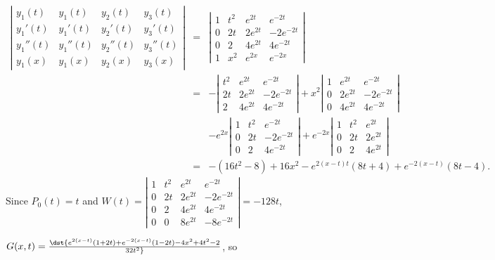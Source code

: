 \documentclass[dvips]{book}
\renewcommand{\exer}[1]{\par\medskip\;\noindent{\color{red}\bf #1.}}
\numberwithin{example}{section}
\numberwithin{equation}{section}
\numberwithin{theorem}{section}
\numberwithin{table}{section}
\numberwithin{figure}{section}
\begin{document}
\exer{9.4.42}
\begin{eqnarray*}
\left|\begin{array}{crcc}
y_1(t)&y_1(t)&y_2(t)&y_3(t)\\
y_1'(t)&y_1'(t)&y_2'(t)&y_3'(t)\\
y_1''(t)&y_1''(t)&y_2''(t)&y_3''(t)\\
y_1(x)&y_1(x)&y_2(x)&y_3(x)
\end{array}\right|&=&
\left|\begin{array}{cccc}
1&t^2&e^{2t}&e^{-2t}\\
0&2t&2e^{2t}&-2e^{-2t}\\
0&2&4e^{2t}&4e^{-2t}\\
1&x^2&e^{2x}&e^{-2x}
\end{array}\right|\\
&=&-\left|\begin{array}{cccc}t^2&e^{2t}&e^{-2t}\\
2t&2e^{2t}&-2e^{-2t}\\2&4e^{2t}&4e^{-2t}\end{array}\right|
+x^2\left|\begin{array}{cccc}1&e^{2t}&e^{-2t}\\
0&2e^{2t}&-2e^{-2t}\\0&4e^{2t}&4e^{-2t}\end{array}\right|\\
&&-e^{2x}\left|\begin{array}{cccc}1&t^2&e^{-2t}\\
0&2t&-2e^{-2t}\\0&2&4e^{-2t}\end{array}\right|
+e^{-2x}\left|\begin{array}{cccc}1&t^2&e^{2t}\\0&2t&2e^{2t}\\
0&2&4e^{2t}\end{array}\right|\\
&=&-(16t^2-8)+16x^2-e^{2(x-t)t}(8t+4)+e^{-2(x-t)}(8t-4).
\end{eqnarray*}
Since $P_0(t)=t$ and
$W(t)=\left|\begin{array}{cccc}
1&t^2&e^{2t}&e^{-2t}\\
0&2t&2e^{2t}&-2e^{-2t}\\
0&2&4e^{2t}&4e^{-2t}\\
0&0&8e^{2t}&-8e^{-2t}
\end{array}\right|=-128t$,

$G(x,t)=\dst{e^{2(x-t)}(1+2t)+e^{-2(x-t)}(1-2t)-4x^2+4t^2-2\over32t^2}$,
so
\end{document}

